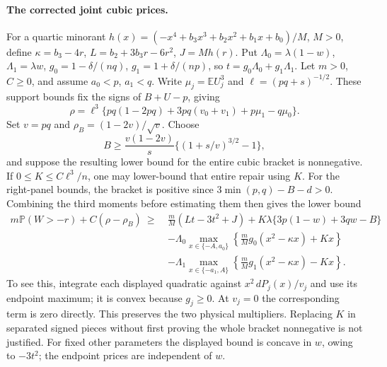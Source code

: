 \documentclass[11pt]{article}
\newcommand{\E}{\mathbb E}
\newcommand{\Pp}{\mathbb P}
\newcommand{\1}{\mathbf1}
\begin{document}
\paragraph{The corrected joint cubic prices.}
For a quartic minorant
$h(x)=(-x^4+b_3x^3+b_2x^2+b_1x+b_0)/M$, $M>0$, define
$\kappa=b_3-4r$, $L=b_2+3b_3r-6r^2$, $J=Mh(r)$.
Put $\Lambda_0=\lambda(1-w)$, $\Lambda_1=\lambda w$,
$g_0=1-\delta/(nq)$, $g_1=1+\delta/(np)$, so
$t=g_0\Lambda_0+g_1\Lambda_1$.
Let $m>0$, $C\ge0$, and assume $a_0<p$, $a_1<q$. Write
$\mu_j=\E U_j^3$ and $\ell=(pq+s)^{-1/2}$. These support bounds fix
the signs of $B+U-p$, giving
\[
 \rho=\ell^3\{pq(1-2pq)+3pq(v_0+v_1)+p\mu_1-q\mu_0\}.
\]
Set $v=pq$ and $\rho_B=(1-2v)/\sqrt v$. Choose
\[
 B\ge \frac{v(1-2v)}s\{(1+s/v)^{3/2}-1\},
\]
and suppose the resulting lower bound for the entire cubic bracket is
nonnegative.
If $0\le K\le C\ell^3/n$, one may lower-bound that entire repair
using $K$. For the right-panel bounds, the bracket is positive since
$3\min(p,q)-B-d>0$. Combining the third moments before estimating them
then gives the lower bound
\begin{align*}
 m\Pp(W>-r)+C(\rho-\rho_B)\ \ge\ &
 \frac mM(Lt-3t^2+J)+K\lambda\{3p(1-w)+3qw-B\}\\
 &-\Lambda_0\max_{x\in\{-A,a_0\}}
       \left\{\frac mM g_0(x^2-\kappa x)+Kx\right\}\\
 &-\Lambda_1\max_{x\in\{-a_1,A\}}
       \left\{\frac mM g_1(x^2-\kappa x)-Kx\right\}.
\end{align*}
To see this, integrate each displayed quadratic against
$x^2\,dP_j(x)/v_j$ and use its endpoint maximum; it is convex because
$g_j\ge0$. At $v_j=0$ the corresponding term is zero directly.
This preserves the two physical multipliers. Replacing $K$ in separated
signed pieces without first proving the whole bracket nonnegative is
not justified. For fixed other parameters the displayed bound is concave
in $w$, owing to $-3t^2$; the endpoint prices are independent of $w$.
\end{document}
